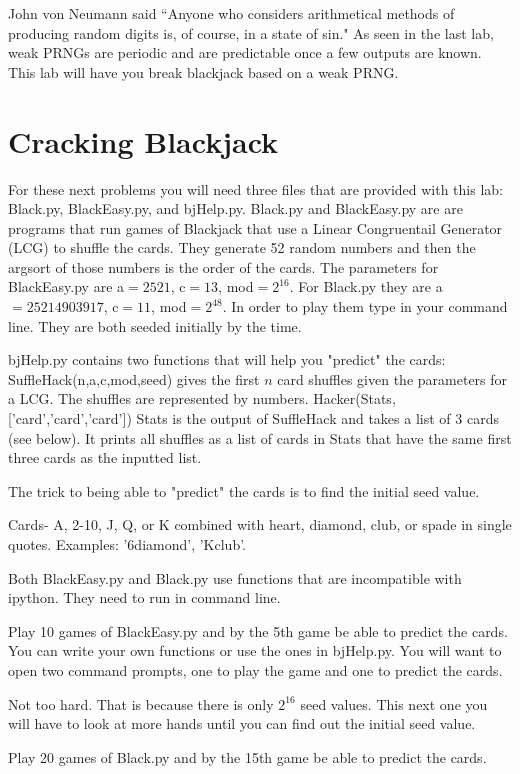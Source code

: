 John von Neumann said ``Anyone who considers arithmetical methods of producing random digits is, of course, in a state of sin."
As seen in the last lab, weak PRNGs are periodic and are predictable once a few outputs are known.
This lab will have you break blackjack based on a weak PRNG.

\section*{Cracking Blackjack}
For these next problems you will need three files that are provided with this lab: Black.py, BlackEasy.py, and bjHelp.py.
Black.py and BlackEasy.py are are programs that run games of Blackjack that use a Linear Congruentail Generator (LCG) to shuffle the cards.
They generate 52 random numbers and then the argsort of those numbers is the order of the cards.
The parameters for BlackEasy.py are a$=2521$, c$=13$, mod$=2^{16}$.
For Black.py they are a$=25214903917$, c$=11$, mod$=2^{48}$.
In order to play them type  in your command line.
They are both seeded initially by the time.

bjHelp.py contains two functions that will help you "predict" the cards:
SuffleHack(n,a,c,mod,seed) gives the first $n$ card shuffles given the parameters for a LCG.
The shuffles are represented by numbers.
Hacker(Stats,['card','card','card']) Stats is the output of SuffleHack and takes a list of 3 cards (see below).
It prints all shuffles as a list of cards in Stats that have the same first three cards as the inputted list.

The trick to being able to "predict" the cards is to find the initial seed value.

Cards- A, 2-10, J, Q, or K combined with heart, diamond, club, or spade in single quotes.
Examples: '6diamond', 'Kclub'.

\begin{warn}
Both BlackEasy.py and Black.py use functions that are incompatible with ipython. They need to run  in command line.
\end{warn}



\begin{problem}
Play 10 games of BlackEasy.py and by the 5th game be able to predict the cards.
You can write your own functions or use the ones in bjHelp.py.
You will want to open two command prompts, one to play the game and one to predict the cards. 
\end{problem}

Not too hard.
That is because there is only $2^{16}$ seed values.
This next one you will have to look at more hands until you can find out the initial seed value.

\begin{problem}
Play 20 games of Black.py and by the 15th game be able to predict the cards.
\end{problem}
